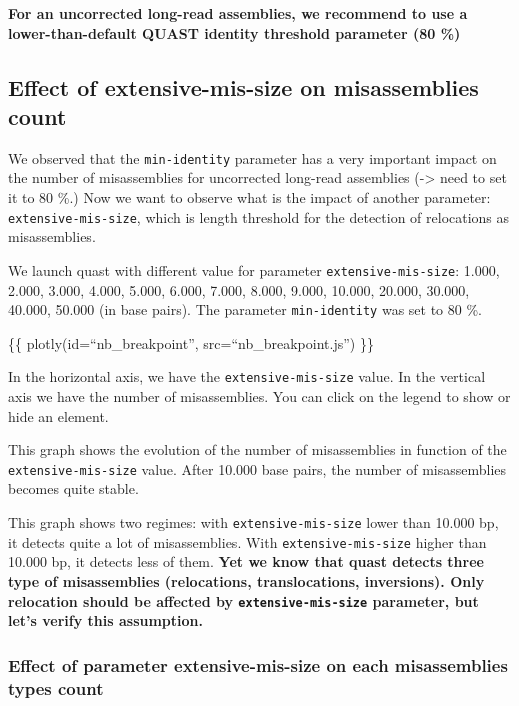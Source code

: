 \documentclass[./main.tex]{subfiles}
\begin{document}
\textbf{For an uncorrected long-read assemblies, we recommend to use a
lower-than-default QUAST identity threshold parameter (80 \%)}

\subsection{Effect of extensive-mis-size on misassemblies
count}\label{effect-of-extensive-mis-size-on-misassemblies-count}

We observed that the \texttt{min-identity} parameter has a very
important impact on the number of misassemblies for uncorrected
long-read assemblies (-\textgreater{} need to set it to 80 \%.) Now we
want to observe what is the impact of another parameter:
\texttt{extensive-mis-size}, which is length threshold for the detection
of relocations as misassemblies.

We launch quast with different value for parameter
\texttt{extensive-mis-size}: 1.000, 2.000, 3.000, 4.000, 5.000, 6.000,
7.000, 8.000, 9.000, 10.000, 20.000, 30.000, 40.000, 50.000 (in base
pairs). The parameter \texttt{min-identity} was set to 80 \%.

\{\{ plotly(id=``nb\_breakpoint'', src=``nb\_breakpoint.js'') \}\}

In the horizontal axis, we have the \texttt{extensive-mis-size} value.
In the vertical axis we have the number of misassemblies. You can click
on the legend to show or hide an element.

This graph shows the evolution of the number of misassemblies in
function of the \texttt{extensive-mis-size} value. After 10.000 base
pairs, the number of misassemblies becomes quite stable.

This graph shows two regimes: with \texttt{extensive-mis-size} lower
than 10.000 bp, it detects quite a lot of misassemblies. With
\texttt{extensive-mis-size} higher than 10.000 bp, it detects less of
them. \textbf{Yet we know that quast detects three type of misassemblies
(relocations, translocations, inversions). Only relocation should be
affected by \texttt{extensive-mis-size} parameter, but let's verify this
assumption.}

\subsubsection{Effect of parameter extensive-mis-size on each
misassemblies types
count}\label{effect-of-parameter-extensive-mis-size-on-each-misassemblies-types-count}
\end{document}
